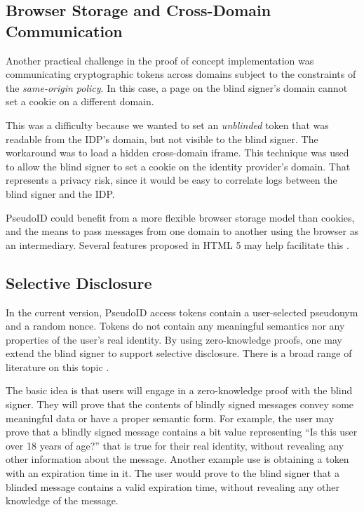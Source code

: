 \documentclass{llncs}
\begin{document}
\subsection{Browser Storage and Cross-Domain Communication}

Another practical challenge in the proof of concept implementation was
communicating cryptographic tokens across domains subject to the
constraints of the \emph{same-origin policy}. In this case, a page on
the blind signer's domain cannot set a cookie on a different domain.

This was a difficulty because we wanted to set an \textit{unblinded}
token that was readable from the IDP's domain, but not visible to the
blind signer. The workaround was to load a hidden cross-domain
iframe. This technique was used to allow the blind signer to set a
cookie on the identity provider's domain. That represents a privacy
risk, since it would be easy to correlate logs between the blind
signer and the IDP.

PseudoID could benefit from a more flexible browser storage model than
cookies, and the means to pass messages from one domain to another
using the browser as an intermediary. Several features proposed in
HTML 5 may help facilitate this \cite{HTML5}.

\subsection{Selective Disclosure}

In the current version, PseudoID access tokens contain a user-selected
pseudonym and a random nonce. Tokens do not contain any meaningful
semantics nor any properties of the user's real identity. By using
zero-knowledge proofs, one may extend the blind signer to support
selective disclosure. There is a broad range of literature on this
topic \cite{Cha85,CaLy01,CaLy04,CHL05,CaGr08}.

The basic idea is that users will engage in a zero-knowledge proof
with the blind signer. They will prove that the contents of blindly
signed messages convey some meaningful data or have a proper semantic
form. For example, the user may prove that a blindly signed message
contains a bit value representing ``Is this user over 18 years of
age?'' that is true for their real identity, without revealing any
other information about the message. Another example use is obtaining
a token with an expiration time in it. The user would prove to the
blind signer that a blinded message contains a valid expiration time,
without revealing any other knowledge of the message.
\end{document}
